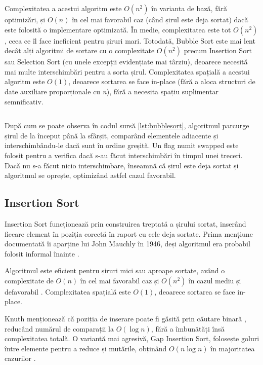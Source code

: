 \documentclass[9pt,a4paper,twocolumn,twoside]{rho-class/rho}
\begin{document}
    Complexitatea \cite{knuth1998sorting} a acestui algoritm este $O(n^2)$ în varianta de bază, fără optimizări, și $O(n)$ în cel mai favorabil caz (când șirul este deja sortat) dacă este folosită o implementare optimizată. În medie, complexitatea este tot $O(n^2)$, ceea ce îl face ineficient pentru șiruri mari.
   \newline Totodată, Bubble Sort este mai lent decât alți algoritmi de sortare cu o complexitate $O(n^2)$ precum Insertion Sort sau Selection Sort (cu unele excepții evidențiate mai târziu), deoarece necesită mai multe interschimbări \cite{astrachan2003bubble} pentru a sorta șirul.
   \newline
   \newline Complexitatea spațială a acestui algoritm este $O(1)$, deoarece sortarea se face in-place (fără a aloca structuri de date auxiliare proporționale cu \textit{n}), fără a necesita spațiu suplimentar semnificativ.
\begin{code}
    \inputminted[style=friendly]{cpp}{cod_sursa/bubblesort.cpp}
    \caption{Implementarea Bubble Sort în C++.}
    \label{lst:bubblesort}
\end{code}


După cum se poate observa în codul sursă \ref{lst:bubblesort}, algoritmul parcurge șirul de la început până la sfârșit, comparând elementele adiacente și interschimbându-le dacă sunt în ordine greșită. Un flag numit swapped este folosit pentru a verifica dacă s-au făcut interschimbări în timpul unei treceri. Dacă nu s-a făcut nicio interschimbare, înseamnă că șirul este deja sortat și algoritmul se oprește, optimizând astfel cazul favorabil.
    

\subsection {Insertion Sort}

Insertion Sort funcționează prin construirea treptată a șirului sortat, 
inserând fiecare element în poziția corectă în raport cu cele deja sortate.
Prima mențiune documentată îi aparține lui John Mauchly în 1946, deși 
algoritmul era probabil folosit informal înainte \cite{knuth1998sorting}.

Algoritmul este eficient pentru șiruri mici sau aproape sortate, având o 
complexitate de $O(n)$ în cel mai favorabil caz și $O(n^2)$ în cazul mediu 
și defavorabil \cite{knuth1998sorting}. Complexitatea spațială este $O(1)$, 
deoarece sortarea se face in-place.

Knuth menționează că poziția de inserare poate fi găsită prin căutare binară 
\cite{knuth1998sorting}, reducând numărul de comparații la $O(\log n)$, fără 
a îmbunătăți însă complexitatea totală. O variantă mai agresivă, Gap Insertion 
Sort, folosește goluri între elemente pentru a reduce și mutările, obținând 
$O(n \log n)$ în majoritatea cazurilor \cite{bender2006insertionislogn}.
\end{document}
